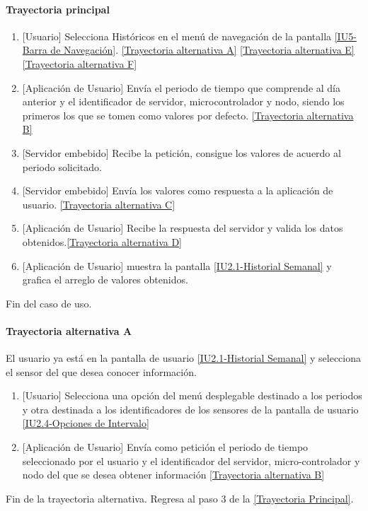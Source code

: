 \paragraph{Trayectoria principal}
    \label{SUB-U-CU1.3:TP}
	\begin{enumerate}
	    \item {[Usuario]} Selecciona Históricos en el menú de navegación de la pantalla \hyperref[fig:Barra de navegacion]{[IU5-Barra de Navegación]}. \hyperref[SUB-U-CU1.3:TA]{[Trayectoria alternativa A]} \hyperref[SUB-U-CU1.3:TE]{[Trayectoria alternativa E]} 
	    \hyperref[SUB-U-CU1.3:TF]{[Trayectoria alternativa F]} 
		\item {[Aplicación de Usuario]} Envía el periodo de tiempo que comprende al día anterior y el identificador de servidor, microcontrolador y nodo, siendo los primeros los que se tomen como valores por defecto. \hyperref[SUB-U-CU1.3:TB]{[Trayectoria alternativa B]} 
		\item {[Servidor embebido]} Recibe la petición, consigue los valores de acuerdo al periodo solicitado. 
		\item {[Servidor embebido]} Envía los valores como respuesta a la aplicación de usuario. \hyperref[SUB-U-CU1.3:TC]{[Trayectoria alternativa C]}
        \item {[Aplicación de Usuario]} Recibe la respuesta del servidor y valida los datos obtenidos.\hyperref[SUB-U-CU1.3:TD]{[Trayectoria alternativa D]}
        \item {[Aplicación de Usuario]} muestra la pantalla \hyperref[fig:Historial Semanal]{[IU2.1-Historial Semanal]} y grafica el arreglo de valores obtenidos. 
	\end{enumerate}
	Fin del caso de uso.

\paragraph{Trayectoria alternativa A} \label{SUB-U-CU1.3:TA}
    El usuario ya está en la pantalla de usuario \hyperref[fig:Historial Semanal]{[IU2.1-Historial Semanal]} y selecciona el sensor del que desea conocer información.
	\begin{enumerate}[label=A\arabic*.]
	    \item {[Usuario]} Selecciona una opción del menú desplegable destinado a los periodos y otra destinada a los identificadores de los sensores de la pantalla de usuario \hyperref[fig:Opciones de Intervalo]{[IU2.4-Opciones de Intervalo]} 
	    \item {[Aplicación de Usuario]} Envía como petición el periodo de tiempo seleccionado por el usuario y el identificador del servidor, micro-controlador y nodo del que se desea obtener información \hyperref[SUB-U-CU1.3:TB]{[Trayectoria alternativa B]} 
	\end{enumerate}
	Fin de la trayectoria alternativa. Regresa al paso 3 de la \hyperref[SUB-U-CU1.3:TP]{[Trayectoria Principal]}.
	
